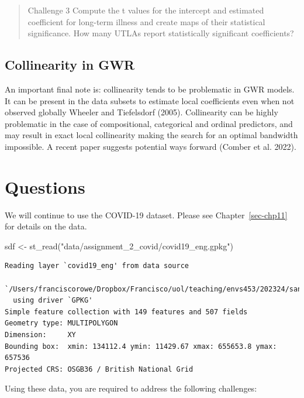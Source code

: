 \documentclass[
  letterpaper,
  DIV=11,
  numbers=noendperiod,
  oneside]{scrreprt}
\newenvironment{Shaded}{\begin{snugshade}}{\end{snugshade}}
\newcommand{\FunctionTok}[1]{\textcolor[rgb]{0.28,0.35,0.67}{#1}}
\newcommand{\NormalTok}[1]{\textcolor[rgb]{0.00,0.23,0.31}{#1}}
\newcommand{\OtherTok}[1]{\textcolor[rgb]{0.00,0.23,0.31}{#1}}
\newcommand{\StringTok}[1]{\textcolor[rgb]{0.13,0.47,0.30}{#1}}
\begin{document}
\begin{quote}
Challenge 3 Compute the t values for the intercept and estimated
coefficient for long-term illness and create maps of their statistical
significance. How many UTLAs report statistically significant
coefficients?
\end{quote}

\subsection{Collinearity in GWR}\label{collinearity-in-gwr}

An important final note is: collinearity tends to be problematic in GWR
models. It can be present in the data subsets to estimate local
coefficients even when not observed globally Wheeler and Tiefelsdorf
(2005). Collinearity can be highly problematic in the case of
compositional, categorical and ordinal predictors, and may result in
exact local collinearity making the search for an optimal bandwidth
impossible. A recent paper suggests potential ways forward (Comber et
al. 2022).

\section{Questions}\label{questions-5}

We will continue to use the COVID-19 dataset. Please see
Chapter~\ref{sec-chp11} for details on the data.

\begin{Shaded}
\begin{Highlighting}[]
\NormalTok{sdf }\OtherTok{\textless{}{-}} \FunctionTok{st\_read}\NormalTok{(}\StringTok{"data/assignment\_2\_covid/covid19\_eng.gpkg"}\NormalTok{)}
\end{Highlighting}
\end{Shaded}

\begin{verbatim}
Reading layer `covid19_eng' from data source 
  `/Users/franciscorowe/Dropbox/Francisco/uol/teaching/envs453/202324/san/data/assignment_2_covid/covid19_eng.gpkg' 
  using driver `GPKG'
Simple feature collection with 149 features and 507 fields
Geometry type: MULTIPOLYGON
Dimension:     XY
Bounding box:  xmin: 134112.4 ymin: 11429.67 xmax: 655653.8 ymax: 657536
Projected CRS: OSGB36 / British National Grid
\end{verbatim}

Using these data, you are required to address the following challenges:
\end{document}
